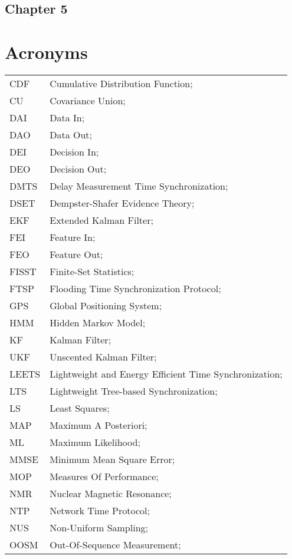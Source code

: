 \subsection*{Chapter 5}

\newpage
\section*{Acronyms}
\begin{longtable}{ll}
	CDF			& Cumulative Distribution Function; \\
	CU			& Covariance Union; \\
	DAI			& Data In; \\
	DAO			& Data Out; \\
	DEI			& Decision In; \\
	DEO 		& Decision Out; \\
	DMTS		& Delay Measurement Time Synchronization; \\
	DSET 		& Dempster-Shafer Evidence Theory; \\		
	EKF			& Extended Kalman Filter; \\
	FEI			& Feature In; \\
	FEO			& Feature Out; \\
	FISST		& Finite-Set Statistics; \\
	FTSP		& Flooding Time Synchronization Protocol; \\
	GPS			& Global Positioning System; \\
	HMM			& Hidden Markov Model; \\
	KF 			& Kalman Filter; \\
	UKF			& Unscented Kalman Filter; \\
	LEETS		& Lightweight and Energy Efficient Time Synchronization; \\
	LTS			& Lightweight Tree-based Synchronization; \\
	LS			& Least Squares; \\
	MAP			& Maximum A Posteriori; \\
	ML			& Maximum Likelihood; \\
	MMSE		& Minimum Mean Square Error; \\
	MOP 		& Measures Of Performance; \\
	NMR 		& Nuclear Magnetic Resonance; \\
	NTP			& Network Time Protocol; \\
	NUS 		& Non-Uniform Sampling; \\ 
	OOSM 		& Out-Of-Sequence Measurement; \\

\end{longtable}
